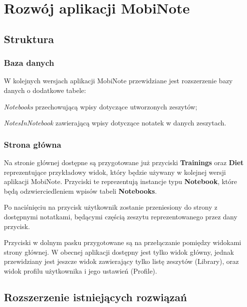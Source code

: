 

\chapter{Rozwój aplikacji MobiNote}
\label{ch:rozwoj}

\section{Struktura}

\subsection{Baza danych}

W kolejnych wersjach aplikacji MobiNote przewidziane jest rozszerzenie bazy danych o dodatkowe tabele:
\begin{compactitem}
    \item \textit{Notebooks} przechowującą wpisy dotyczące utworzonych zeszytów;
    \item \textit{NotesInNotebook} zawierającą wpisy dotyczące notatek w danych zeszytach.
\end{compactitem}

\subsection{Strona główna}

Na stronie głównej dostępne są przygotowane już przyciski \textbf{Trainings} oraz \textbf{Diet} reprezentujące przykładowy widok, który będzie używany w kolejnej wersji aplikacji MobiNote. Przyciski te reprezentują instancje typu \textbf{Notebook}, które będą odzwierciedleniem wpisów tabeli \textbf{Notebooks}.

Po naciśnięciu na przycisk użytkownik zostanie przeniesiony do strony z dostępnymi notatkami, będącymi częścią zeszytu reprezentowanego przez dany przycisk.

Przyciski w dolnym pasku przygotowane są na przełączanie pomiędzy widokami strony głównej. W obecnej aplikacji dostępny jest tylko widok główny, jednak przewidziany jest jeszcze widok zawierający tylko listę zeszytów (Library), oraz widok profilu użytkownika i jego ustawień (Profile).

\section{Rozszerzenie istniejących rozwiązań}

